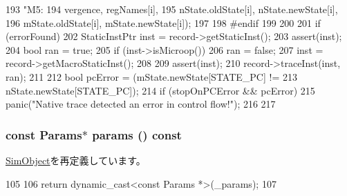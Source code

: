 \begin{DoxyCode}
{{{{193                                       "M5:     %
194                                       vergence, regNames[i],
195                                       nState.oldState[i], nState.newState[i],
196                                       mState.oldState[i], mState.newState[i]);
197             }
198 #endif
199         }
200     }
201     if (errorFound) {
202         StaticInstPtr inst = record->getStaticInst();
203         assert(inst);
204         bool ran = true;
205         if (inst->isMicroop()) {
206             ran = false;
207             inst = record->getMacroStaticInst();
208         }
209         assert(inst);
210         record->traceInst(inst, ran);
211 
212         bool pcError = (mState.newState[STATE_PC] !=
213                         nState.newState[STATE_PC]);
214         if (stopOnPCError && pcError)
215             panic("Native trace detected an error in control flow!");
216     }
217 }
\end{DoxyCode}
\hypertarget{classTrace_1_1ArmNativeTrace_acd3c3feb78ae7a8f88fe0f110a718dff}{
\subsubsection[{params}]{\setlength{\rightskip}{0pt plus 5cm}const {\bf Params}$\ast$ params () const}}
\label{classTrace_1_1ArmNativeTrace_acd3c3feb78ae7a8f88fe0f110a718dff}


\hyperlink{classSimObject_acd3c3feb78ae7a8f88fe0f110a718dff}{SimObject}を再定義しています。


\begin{DoxyCode}
105     {
106         return dynamic_cast<const Params *>(_params);
107     }
\end{DoxyCode}


